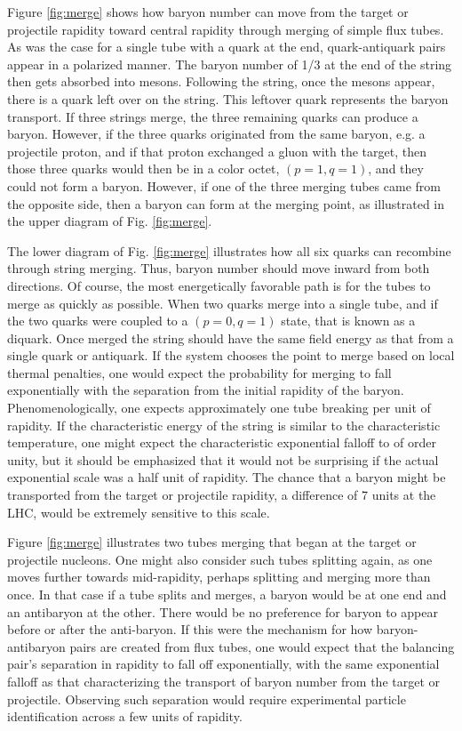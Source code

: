 \documentclass[aps, prc, 12pt, nofootinbib, showpacs, superscriptaddress, tightenlines, groupedaddress]{revtex4-2}
\begin{document}
Figure \ref{fig:merge} shows how baryon number can move from the target or projectile rapidity toward central rapidity through merging of simple flux tubes. As was the case for a single tube with a quark at the end, quark-antiquark pairs appear in a polarized manner. The baryon number of 1/3 at the end of the string then gets absorbed into mesons. Following the string, once the mesons appear, there is a quark left over on the string. This leftover quark represents the baryon transport. If three strings merge, the three remaining quarks can produce a baryon. However, if the three quarks originated from the same baryon, e.g. a projectile proton, and if that proton exchanged a gluon with the target, then those three quarks would then be in a color octet, $(p=1,q=1)$, and they could not form a baryon. However, if one of the three merging tubes came from the opposite side, then a baryon can form at the merging point, as illustrated in the upper diagram of Fig. \ref{fig:merge}.

The lower diagram of Fig. \ref{fig:merge} illustrates how all six quarks can recombine through string merging. Thus, baryon number should move inward from both directions. Of course, the most energetically favorable path is for the tubes to merge as quickly as possible. When two quarks merge into a single tube, and if the two quarks were coupled to a $(p=0,q=1)$ state, that is known as a diquark. Once merged the string should have the same field energy as that from a single quark or antiquark. If the system chooses the point to merge based on local thermal penalties, one would expect the probability for merging to fall exponentially with the separation from the initial rapidity of the baryon. Phenomenologically, one expects approximately one tube breaking per unit of rapidity. If the characteristic energy of the string is similar to the characteristic temperature, one might expect the characteristic exponential falloff to of order unity, but it should be emphasized that it would not be surprising if the actual exponential scale was a half unit of rapidity. The chance that a baryon might be transported from the target or projectile rapidity, a difference of 7 units at the LHC, would be extremely sensitive to this scale.

Figure \ref{fig:merge} illustrates two tubes merging that began at the target or projectile nucleons. One might also consider such tubes splitting again, as one moves further towards mid-rapidity, perhaps splitting and merging more than once. In that case if a tube splits and merges, a baryon would be at one end and an antibaryon at the other. There would be no preference for baryon to appear before or after the anti-baryon. If this were the mechanism for how baryon-antibaryon pairs are created from flux tubes, one would expect that the balancing pair's separation in rapidity to fall off exponentially, with the same exponential falloff as that characterizing the transport of baryon number from the target or projectile. Observing such separation would require experimental particle identification across a few units of rapidity.
\end{document}
